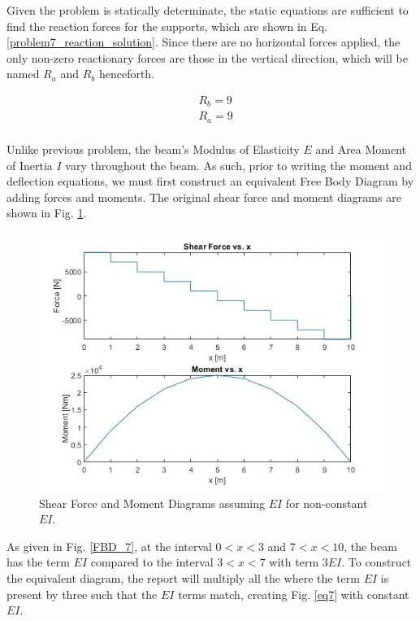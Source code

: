 \documentclass[a4paper]{article}
\begin{document}
Given the problem is statically determinate, the static equations are sufficient to find the reaction forces for the supports, which are shown in Eq. \ref{problem7_reaction_solution}. Since there are no horizontal forces applied, the only non-zero reactionary forces are those in the vertical direction, which will be named $R_a$ and $R_b$ henceforth.

\begin{equation}
\begin{split}
	& R_b = 9 \\
	& R_a = 9 \\
\end{split}
\label{problem7_reaction_solution}
\end{equation}

Unlike previous problem, the beam's Modulus of Elasticity $E$ and Area Moment of Inertia $I$ vary throughout the beam. As such, prior to writing the moment and deflection equations, we must first construct an equivalent Free Body Diagram by adding forces and moments. The original shear force and moment diagrams are shown in Fig. \ref{noneq7}.

\begin{figure}[h]
\includegraphics[width=\textwidth]{results/noneq7.jpg}
\caption{Shear Force and Moment Diagrams assuming $EI$ for non-constant $EI$.}
\label{noneq7}
\end{figure}

As given in Fig. \ref{FBD_7}, at the interval $0<x<3$ and $7<x<10$, the beam has the term $EI$ compared to the interval $3<x<7$ with term $3EI$. To construct the equivalent diagram, the report will multiply all the where the term $EI$ is present by three such that the $EI$ terms match, creating Fig. \ref{eq7} with constant $EI$.
\end{document}

